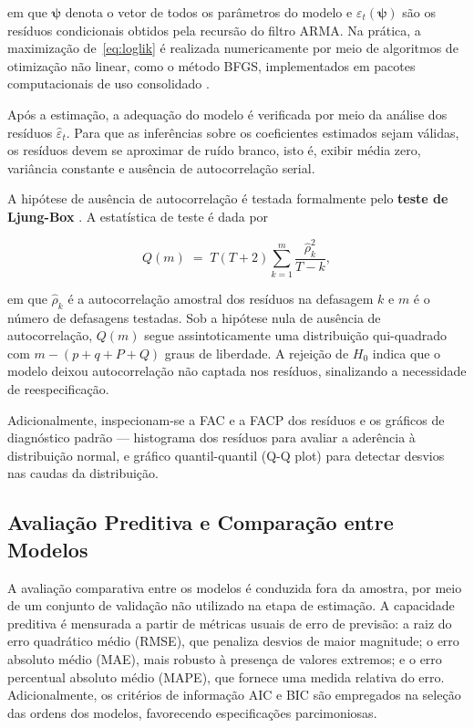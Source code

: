\noindent
em que \(\boldsymbol{\psi}\) denota o vetor de todos os parâmetros do modelo e
\(\varepsilon_t(\boldsymbol{\psi})\) são os resíduos condicionais obtidos
pela recursão do filtro ARMA. Na prática, a maximização de~\eqref{eq:loglik}
é realizada numericamente por meio de algoritmos de otimização não linear,
como o método BFGS, implementados em pacotes computacionais de uso
consolidado \citep{shumway2017}.
 

Após a estimação, a adequação do modelo é verificada por meio da análise
dos resíduos \(\hat\varepsilon_t\). Para que as inferências sobre os
coeficientes estimados sejam válidas, os resíduos devem se aproximar de
ruído branco, isto é, exibir média zero, variância constante e ausência de
autocorrelação serial.
 
A hipótese de ausência de autocorrelação é testada formalmente pelo
\textbf{teste de Ljung-Box} \citep{ljung1978}. A estatística de teste é
dada por
 
\begin{equation}
  Q(m) \;=\; T(T+2)\sum_{k=1}^{m}\frac{\hat{\rho}_k^2}{T - k},
  \label{eq:ljungbox}
\end{equation}
 
\noindent
em que \(\hat{\rho}_k\) é a autocorrelação amostral dos resíduos na defasagem
\(k\) e \(m\) é o número de defasagens testadas. Sob a hipótese nula de
ausência de autocorrelação, \(Q(m)\) segue assintoticamente uma distribuição
qui-quadrado com \(m - (p + q + P + Q)\) graus de liberdade. A rejeição de
\(H_0\) indica que o modelo deixou autocorrelação não captada nos resíduos,
sinalizando a necessidade de reespecificação.
 
Adicionalmente, inspecionam-se a FAC e a FACP dos resíduos e os gráficos de
diagnóstico padrão — histograma dos resíduos para avaliar a aderência à
distribuição normal, e gráfico quantil-quantil (Q-Q plot) para detectar
desvios nas caudas da distribuição.
 
\subsection{Avaliação Preditiva e Comparação entre Modelos}
\label{sec:sarimax_eval}
 
A avaliação comparativa entre os modelos é conduzida fora da amostra, por
meio de um conjunto de validação não utilizado na etapa de estimação. A
capacidade preditiva é mensurada a partir de métricas usuais de erro de
previsão: a raiz do erro quadrático médio (RMSE), que penaliza desvios de
maior magnitude; o erro absoluto médio (MAE), mais robusto à presença de
valores extremos; e o erro percentual absoluto médio (MAPE), que fornece
uma medida relativa do erro. Adicionalmente, os critérios de informação AIC
e BIC são empregados na seleção das ordens dos modelos, favorecendo
especificações parcimoniosas.
 
